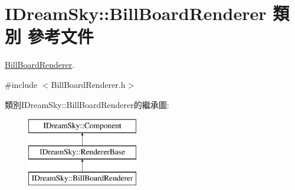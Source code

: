 \hypertarget{class_i_dream_sky_1_1_bill_board_renderer}{}\section{I\+Dream\+Sky\+:\+:Bill\+Board\+Renderer 類別 參考文件}
\label{class_i_dream_sky_1_1_bill_board_renderer}


\hyperlink{class_i_dream_sky_1_1_bill_board_renderer}{Bill\+Board\+Renderer}.  




{\ttfamily \#include $<$Bill\+Board\+Renderer.\+h$>$}

類別\+I\+Dream\+Sky\+:\+:Bill\+Board\+Renderer的繼承圖\+:\begin{figure}[H]
\begin{center}
\leavevmode
\includegraphics[height=3.000000cm]{class_i_dream_sky_1_1_bill_board_renderer}
\end{center}
\end{figure}
